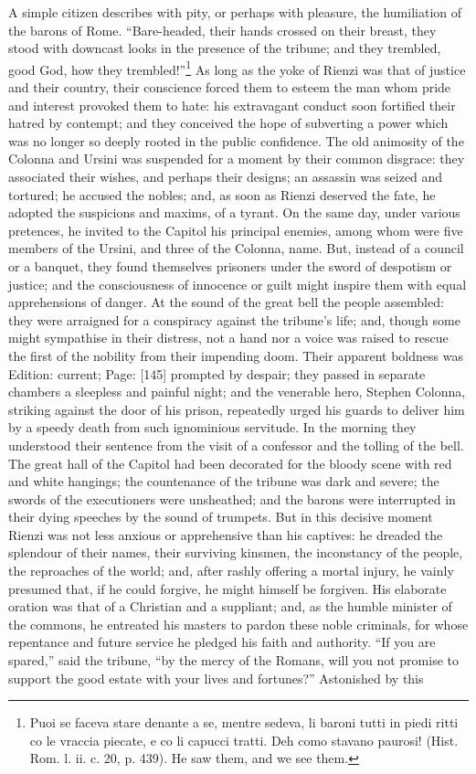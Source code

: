 A simple citizen describes with pity, or perhaps with pleasure, the humiliation of the barons of Rome. \texthebrew{“}Bare-headed, their hands crossed on their breast, they stood with downcast looks in the presence of the tribune; and they trembled, good God, how they trembled!\texthebrew{}”\footnote{Puoi se faceva stare denante a se, mentre sedeva, li baroni tutti in piedi ritti co le vraccia piecate, e co li capucci tratti. Deh como stavano paurosi! (Hist. Rom. l. ii. c. 20, p. 439). He saw them, and we see them.} As long as the yoke of Rienzi was that of justice and their country, their conscience forced them to esteem the man whom pride and interest provoked them to hate: his extravagant conduct soon fortified their hatred by contempt; and they conceived the hope of subverting a power which was no longer so deeply rooted in the public confidence. The old animosity of the Colonna and Ursini was suspended for a moment by their common disgrace: they associated their wishes, and perhaps their designs; an assassin was seized and tortured; he accused the nobles; and, as soon as Rienzi deserved the fate, he adopted the suspicions and maxims, of a tyrant. On the same day, under various pretences, he invited to the Capitol his principal enemies, among whom were five members of the Ursini, and three of the Colonna, name. But, instead of a council or a banquet, they found themselves prisoners under the sword of despotism or justice; and the consciousness of innocence or guilt might inspire them with equal apprehensions of danger. At the sound of the great bell the people assembled: they were arraigned for a conspiracy against the tribune\texthebrew{}’s life; and, though some might sympathise in their distress, not a hand nor a voice was raised to rescue the first of the nobility from their impending doom. Their apparent boldness was Edition: current; Page: [145] prompted by despair; they passed in separate chambers a sleepless and painful night; and the venerable hero, Stephen Colonna, striking against the door of his prison, repeatedly urged his guards to deliver him by a speedy death from such ignominious servitude. In the morning they understood their sentence from the visit of a confessor and the tolling of the bell. The great hall of the Capitol had been decorated for the bloody scene with red and white hangings; the countenance of the tribune was dark and severe; the swords of the executioners were unsheathed; and the barons were interrupted in their dying speeches by the sound of trumpets. But in this decisive moment Rienzi was not less anxious or apprehensive than his captives: he dreaded the splendour of their names, their surviving kinsmen, the inconstancy of the people, the reproaches of the world; and, after rashly offering a mortal injury, he vainly presumed that, if he could forgive, he might himself be forgiven. His elaborate oration was that of a Christian and a suppliant; and, as the humble minister of the commons, he entreated his masters to pardon these noble criminals, for whose repentance and future service he pledged his faith and authority. \texthebrew{“}If you are spared,\texthebrew{}” said the tribune, \texthebrew{“}by the mercy of the Romans, will you not promise to support the good estate with your lives and fortunes?\texthebrew{}” Astonished by this 